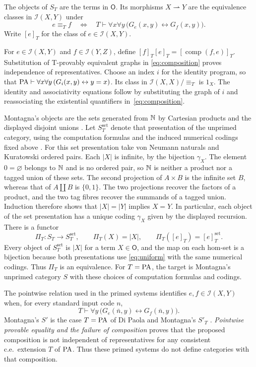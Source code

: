 The objects of $S_T$ are the terms in $\mathsf O$. Its morphisms
$X\rightharpoonup Y$ are the equivalence classes in
$\mathcal I(X,Y)$ under
\begin{equation}\label{eq:uniform}
 e\equiv_T f
 \quad\Longleftrightarrow\quad
 T\vdash \forall x\forall y\,
       \bigl(G_e(x,y)\leftrightarrow G_f(x,y)\bigr).
\end{equation}
Write $[e]_T$ for the class of $e\in\mathcal I(X,Y)$.

For $e\in\mathcal I(X,Y)$ and $f\in\mathcal I(Y,Z)$, define
$[f]_T[e]_T=[\operatorname{comp}(f,e)]_T$.
Substitution of T-provably equivalent graphs in
\eqref{eq:composition} proves independence of representatives.
Choose an index $i$ for the identity program, so that
$\mathrm{PA}\vdash\forall x\forall y\,(G_i(x,y)\leftrightarrow y=x)$.
Its class in $\mathcal I(X,X)/{\equiv_T}$ is $1_X$.
The identity and associativity equations follow by substituting
the graph of $i$ and reassociating the existential quantifiers
in~\eqref{eq:composition}.

Montagna's objects are the sets generated from $\mathbb N$ by
Cartesian products and the displayed disjoint unions
\cite[p.~105]{Montagna}. Let $S_T^{\mathrm{set}}$ denote that
presentation of the unprimed category, using the computation
formulas and the induced numerical codings fixed above
\cite[p.~646]{DPM}. For this set presentation take von Neumann
naturals and Kuratowski ordered pairs. Each $|X|$ is infinite, by
the bijection $\gamma_X$. The element $0=\varnothing$ belongs to
$\mathbb N$ and is no ordered pair, so $\mathbb N$ is neither a product nor a
tagged union of these sets. The second projection of $A\times B$
is the infinite set $B$, whereas that of $A\amalg B$ is $\{0,1\}$.
The two projections recover the factors of a product, and the two
tag fibres recover the summands of a tagged union. Induction
therefore shows that $|X|=|Y|$ implies $X=Y$. In particular, each
object of the set presentation has a unique coding $\gamma_X$
given by the displayed recursion. There is a functor
\[
 \Pi_T:S_T\longrightarrow S_T^{\mathrm{set}},\qquad
 \Pi_T(X)=|X|,\qquad \Pi_T([e]_T)=[e]_T^{\mathrm{set}}.
\]
Every object of $S_T^{\mathrm{set}}$ is $|X|$ for a term
$X\in\mathsf O$, and the map on each hom-set is a bijection
because both presentations use \eqref{eq:uniform} with the same
numerical codings. Thus $\Pi_T$ is an equivalence. For $T=\mathrm{PA}$,
the target is Montagna's unprimed category $S$ with these choices
of computation formulas and codings.

The pointwise relation used in the primed systems identifies
$e,f\in\mathcal I(X,Y)$ when, for every standard input code $n$,
\[
 T\vdash\forall y\,
   \bigl(G_e(\bar n,y)\leftrightarrow G_f(\bar n,y)\bigr).
\]
Montagna's $S'$ is the case
$T=\mathrm{PA}$ of Di Paola and Montagna's $S'_T$ \cite{Montagna,DPM}.
\emph{Pointwise provable equality and the failure of composition}
\cite[Corollary 2]{Composition} proves that the proposed composition
is not independent of representatives for any consistent c.e.\
extension $T$ of $\mathrm{PA}$. Thus these primed systems do not define
categories with that composition.

